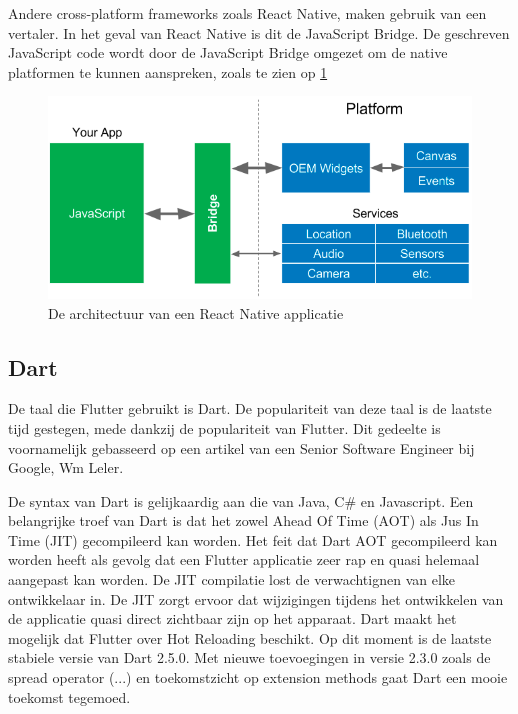 Andere cross-platform frameworks zoals React Native, maken gebruik van een vertaler. In het geval van React Native is dit de JavaScript Bridge. De geschreven JavaScript code wordt door de JavaScript Bridge omgezet om de native platformen te kunnen aanspreken, zoals te zien op \ref{fig:react-native-app-architecture}  \autocite{Kuitunen2019}

\begin{figure}
    \includegraphics[width=\linewidth]{img/stand-van-zaken/react-native-app-architecture.png}
    \caption{De architectuur van een React Native applicatie}
    \label{fig:react-native-app-architecture}
\end{figure}


\subsection{Dart}
De taal die Flutter gebruikt is Dart. De populariteit van deze taal is de laatste tijd gestegen, mede dankzij de populariteit van Flutter.
Dit gedeelte is voornamelijk gebasseerd op een artikel van een Senior Software Engineer bij Google, Wm Leler.

De syntax van Dart is gelijkaardig aan die van Java, C# en Javascript.
Een belangrijke troef van Dart is dat het zowel Ahead Of Time (AOT) als Jus In Time (JIT) gecompileerd kan worden. Het feit dat Dart AOT gecompileerd kan worden heeft als gevolg dat een Flutter applicatie zeer rap en quasi helemaal aangepast kan worden.
De JIT compilatie lost de verwachtignen van elke ontwikkelaar in. De JIT zorgt ervoor dat wijzigingen tijdens het ontwikkelen van de applicatie quasi direct zichtbaar zijn op het apparaat. Dart maakt het mogelijk dat Flutter over Hot Reloading beschikt. \autocite{Leler2017a}
\newline
Op dit moment is de laatste stabiele versie van Dart 2.5.0. Met nieuwe toevoegingen in versie 2.3.0 zoals de spread operator (...) en toekomstzicht op extension methods gaat Dart een mooie toekomst tegemoed. \autocite{Thomsen2019}